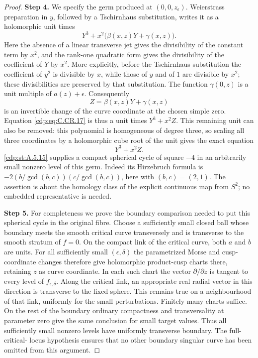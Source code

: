 \begin{proof}
\noindent\textbf{Step 4.} We specify the germ produced at
$(0,0,z_\epsilon)$. Weierstrass preparation in $y$,
followed by a Tschirnhaus substitution, writes it as
a holomorphic unit times
\[
             Y^3+x^2\bigl(\beta(x,z)Y+\gamma(x,z)\bigr).
 \tag{C.CR.17}\label{cdp:eq:C.CR.17}
\]
Here the absence of a linear transverse jet gives
the divisibility of the constant term by $x^2$,
and the rank-one quadratic form gives the divisibility
of the coefficient of $Y$ by $x^2$. More explicitly,
before the Tschirnhaus substitution the coefficient
of $y^2$ is divisible by $x$, while those of $y$
and of $1$ are divisible by $x^2$; these divisibilities
are preserved by that substitution.
The function $\gamma(0,z)$ is a unit multiple of
$a(z)+\epsilon$. Consequently
\[
             Z=\beta(x,z)Y+\gamma(x,z)
\]
is an invertible change of the curve coordinate at
the chosen simple zero. Equation \eqref{cdp:eq:C.CR.17} is thus
a unit times $Y^3+x^2Z$. This remaining unit can
also be removed: this polynomial is homogeneous
of degree three, so scaling all three coordinates
by a holomorphic cube root of the unit gives the
exact equation
\[
                            Y^3+x^2Z.
 \tag{C.CR.18}\label{cdp:eq:C.CR.18}
\]
\ref{cdp:st:A.5.15} supplies a compact spherical cycle of square $-4$
in an arbitrarily small nonzero level of this germ.
Indeed its Hirzebruch formula is
$-2(b/\gcd(b,c))(c/\gcd(b,c))$, here with
$(b,c)=(2,1)$. The assertion is about the homology
class of the explicit continuous map from $S^2$;
no embedded representative is needed.

\noindent\textbf{Step 5.} For completeness we prove the boundary comparison
needed to put this spherical cycle in the original fibre.
Choose a sufficiently small closed ball whose
boundary meets the smooth critical curve transversely
and is transverse to the smooth stratum of $f=0$.
On the compact link of the critical curve, both
$a$ and $b$ are units. For all sufficiently small
$(\epsilon,\delta)$ the parametrized Morse and
cusp-coordinate changes therefore give holomorphic
product-cusp charts there, retaining $z$ as curve
coordinate. In each such chart the vector
$\partial/\partial z$ is tangent to every level
of $f_{\epsilon,\delta}$. Along the critical link,
an appropriate real radial vector in this direction
is transverse to the fixed sphere. This remains
true on a neighbourhood of that link, uniformly
for the small perturbations. Finitely many charts
suffice. On the rest of the boundary ordinary
compactness and transversality at parameter zero
give the same conclusion for small target values.
Thus all sufficiently small nonzero levels have
uniformly transverse boundary. The full-critical-
locus hypothesis ensures that no other boundary
singular curve has been omitted from this argument.


\end{proof}

